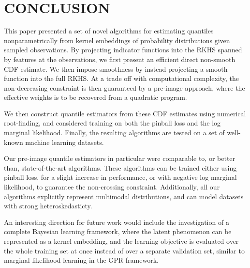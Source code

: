 \documentclass[twoside]{article} \usepackage{aistats2017}
\theoremstyle{definition}
\theoremstyle{theorem}
\begin{document}
\section{CONCLUSION}
\label{sec:conclusion}
	
	This paper presented a set of novel algorithms for estimating quantiles nonparametrically from kernel embeddings of probability distributions given sampled observations. By projecting indicator functions into the RKHS spanned by features at the observations, we first present an efficient direct non-smooth CDF estimate. We then impose smoothness by instead projecting a smooth function into the full RKHS. At a trade off with computational complexity, the non-decreasing constraint is then guaranteed by a pre-image approach, where the effective weights is to be recovered from a quadratic program.
	
	We then construct quantile estimators from these CDF estimates using numerical root-finding, and considered training on both the pinball loss and the log marginal likelihood. Finally, the resulting algorithms are tested on a set of well-known machine learning datasets.
	
	Our pre-image quantile estimators in particular were comparable to, or better than, state-of-the-art algorithms. These algorithms can be trained either using pinball loss, for a slight increase in performance, or with negative log marginal likelihood, to guarantee the non-crossing constraint. Additionally, all our algorithms explicitly represent multimodal distributions, and can model datasets with strong heteroskedasticty.
	
	An interesting direction for future work would include the investigation of a complete Bayesian learning framework, where the latent phenomenon can be represented as a kernel embedding, and the learning objective is evaluated over the whole training set at once instead of over a separate validation set, similar to marginal likelihood learning in the GPR framework.

%

\newpage

\end{document}
